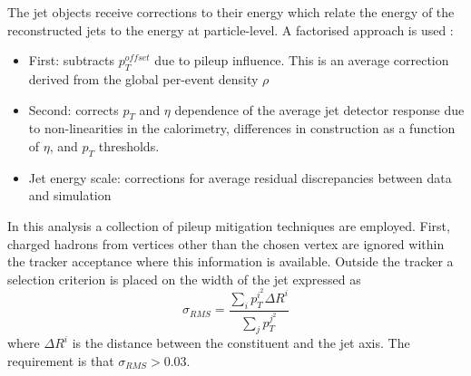 The jet objects receive corrections to their energy which relate the energy of the reconstructed jets to the energy at particle-level. A factorised approach is used \cite{JetPerformance}:
\begin{itemize}[leftmargin=.5in,noitemsep]
    \item First: subtracts $p_{T}^{offset}$ due to pileup influence. This is an average correction derived from the global per-event density $\rho$
    \item Second: corrects $p_{T}$ and $\eta$ dependence of the average jet detector response due to non-linearities in the calorimetry, differences in construction as a function of $\eta$, and $p_{T}$ thresholds.
    \item Jet energy scale: corrections for average residual discrepancies between data and simulation
\end{itemize}

In this analysis a collection of pileup mitigation techniques are employed. First, charged hadrons from vertices other than the chosen vertex are ignored within the tracker acceptance where this information is available. Outside the tracker a selection criterion is placed on the width of the jet expressed as
\begin{equation}
    \sigma_{RMS} = \frac{\sum_{i}p_{T}^{i^2}\Delta{R}^{i}}{\sum_{j}p_{T}^{j^2}}
\end{equation}
where $\Delta{R}^{i}$ is the distance between the constituent and the jet axis. The requirement is that $\sigma_{RMS} > 0.03$. 



